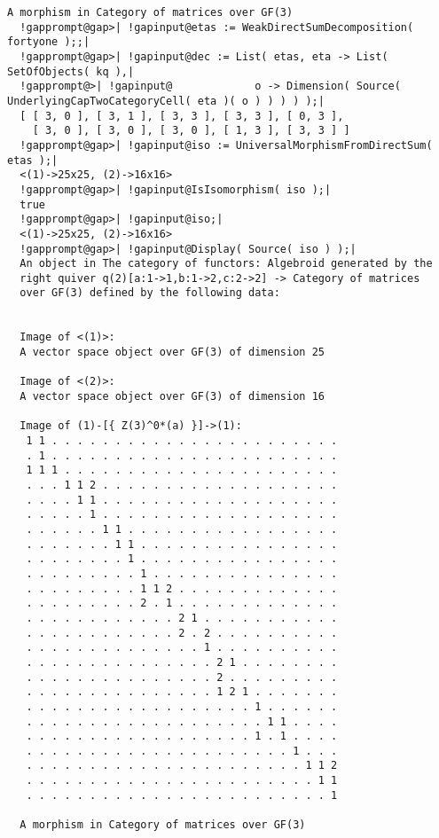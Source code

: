 \documentclass[a4paper,11pt]{report}
\begin{document}
{{{\begin{Verbatim}[commandchars=!@|,fontsize=\small,frame=single,label=Example]
  A morphism in Category of matrices over GF(3)
  !gapprompt@gap>| !gapinput@etas := WeakDirectSumDecomposition( fortyone );;|
  !gapprompt@gap>| !gapinput@dec := List( etas, eta -> List( SetOfObjects( kq ),|
  !gapprompt@>| !gapinput@             o -> Dimension( Source( UnderlyingCapTwoCategoryCell( eta )( o ) ) ) ) );|
  [ [ 3, 0 ], [ 3, 1 ], [ 3, 3 ], [ 3, 3 ], [ 0, 3 ],
    [ 3, 0 ], [ 3, 0 ], [ 3, 0 ], [ 1, 3 ], [ 3, 3 ] ]
  !gapprompt@gap>| !gapinput@iso := UniversalMorphismFromDirectSum( etas );|
  <(1)->25x25, (2)->16x16>
  !gapprompt@gap>| !gapinput@IsIsomorphism( iso );|
  true
  !gapprompt@gap>| !gapinput@iso;|
  <(1)->25x25, (2)->16x16>
  !gapprompt@gap>| !gapinput@Display( Source( iso ) );|
  An object in The category of functors: Algebroid generated by the
  right quiver q(2)[a:1->1,b:1->2,c:2->2] -> Category of matrices
  over GF(3) defined by the following data:
  
  
  Image of <(1)>:
  A vector space object over GF(3) of dimension 25
  
  Image of <(2)>:
  A vector space object over GF(3) of dimension 16
  
  Image of (1)-[{ Z(3)^0*(a) }]->(1):
   1 1 . . . . . . . . . . . . . . . . . . . . . . .
   . 1 . . . . . . . . . . . . . . . . . . . . . . .
   1 1 1 . . . . . . . . . . . . . . . . . . . . . .
   . . . 1 1 2 . . . . . . . . . . . . . . . . . . .
   . . . . 1 1 . . . . . . . . . . . . . . . . . . .
   . . . . . 1 . . . . . . . . . . . . . . . . . . .
   . . . . . . 1 1 . . . . . . . . . . . . . . . . .
   . . . . . . . 1 1 . . . . . . . . . . . . . . . .
   . . . . . . . . 1 . . . . . . . . . . . . . . . .
   . . . . . . . . . 1 . . . . . . . . . . . . . . .
   . . . . . . . . . 1 1 2 . . . . . . . . . . . . .
   . . . . . . . . . 2 . 1 . . . . . . . . . . . . .
   . . . . . . . . . . . . 2 1 . . . . . . . . . . .
   . . . . . . . . . . . . 2 . 2 . . . . . . . . . .
   . . . . . . . . . . . . . . 1 . . . . . . . . . .
   . . . . . . . . . . . . . . . 2 1 . . . . . . . .
   . . . . . . . . . . . . . . . 2 . . . . . . . . .
   . . . . . . . . . . . . . . . 1 2 1 . . . . . . .
   . . . . . . . . . . . . . . . . . . 1 . . . . . .
   . . . . . . . . . . . . . . . . . . . 1 1 . . . .
   . . . . . . . . . . . . . . . . . . 1 . 1 . . . .
   . . . . . . . . . . . . . . . . . . . . . 1 . . .
   . . . . . . . . . . . . . . . . . . . . . . 1 1 2
   . . . . . . . . . . . . . . . . . . . . . . . 1 1
   . . . . . . . . . . . . . . . . . . . . . . . . 1
  
  A morphism in Category of matrices over GF(3)
  

\end{Verbatim}}}}
\end{document}
